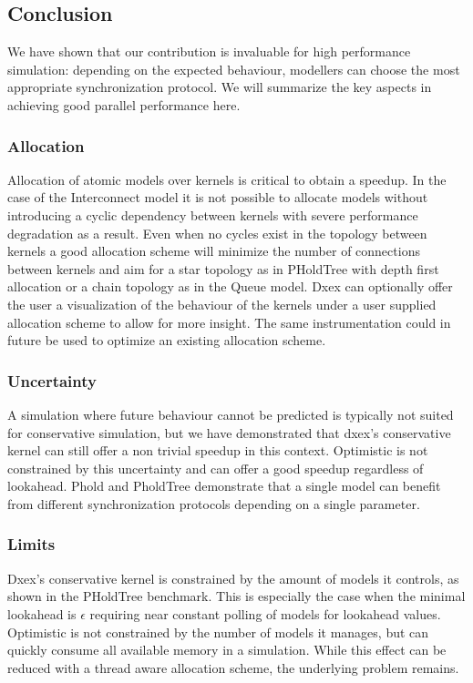 \subsection{Conclusion}
We have shown that our contribution is invaluable for high performance simulation: depending on the expected behaviour, modellers can choose the most appropriate synchronization protocol.
We will summarize the key aspects in achieving good parallel performance here. %
\subsubsection{Allocation}
Allocation of atomic models over kernels is critical to obtain a speedup. 
In the case of the Interconnect model it is not possible to allocate models without introducing a cyclic dependency between kernels with severe performance degradation as a result. 
Even when no cycles exist in the topology between kernels a good allocation scheme will minimize the number of connections between kernels and aim for a star topology as in PHoldTree with depth first allocation or a chain topology as in the Queue model. 
Dxex can optionally offer the user a visualization of the behaviour of the kernels under a user supplied allocation scheme to allow for more insight. 
The same instrumentation could in future be used to optimize an existing allocation scheme.
\subsubsection{Uncertainty}
A simulation where future behaviour cannot be predicted is typically not suited for conservative simulation, but we have demonstrated that dxex's conservative kernel can still offer a non trivial speedup in this context. 
Optimistic is not constrained by this uncertainty and can offer a good speedup regardless of lookahead. 
Phold and PholdTree demonstrate that a single model can benefit from different synchronization protocols depending on a single parameter.
\subsubsection{Limits}
Dxex's conservative kernel is constrained by the amount of models it controls, as shown in the PHoldTree benchmark. This is especially the case when the minimal lookahead is $\epsilon$ requiring near constant polling of models for lookahead values. 
Optimistic is not constrained by the number of models it manages, but can quickly consume all available memory in a simulation. While this effect can be reduced with a thread aware allocation scheme, the underlying problem remains.
